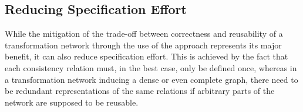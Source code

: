 


\subsection{Reducing Specification Effort}
\label{chap:improvement:benefits:specification_effort}

While the mitigation of the trade-off between correctness and reusability of a transformation network through the use of the \commonalities approach represents its major benefit, it can also reduce specification effort.
This is achieved by the fact that each consistency relation must, in the best case, only be defined once, whereas in a transformation network inducing a dense or even complete graph, there need to be redundant representations of the same relations if arbitrary parts of the network are supposed to be reusable.

